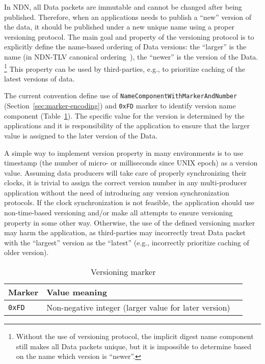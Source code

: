 In NDN, all Data packets are immutable and cannot be changed after being published.
Therefore, when an applications needs to publish a ``new'' version of the data, it should be published under a new unique name using a proper versioning protocol.
The main goal and property of the versioning protocol is to explicitly define the name-based ordering of Data versions: the ``larger'' is the name (in NDN-TLV canonical ordering~\cite{ndn-tlv}), the ``newer'' is the version of the Data.%
\footnote{Without the use of versioning protocol, the implicit digest name component still makes all Data packets unique, but it is impossible to determine based on the name which version is ``newer''.}
This property can be used by third-parties, e.g., to prioritize caching of the latest versions of data.

The current convention define use of \texttt{NameComponentWithMarkerAndNumber} (Section~\ref{sec:marker-encoding}) and \verb|0xFD| marker to identify version name component (Table~\ref{tab:versioning}).
The specific value for the version is determined by the applications and it is responsibility of the application to ensure that the larger value is assigned to the later version of the Data.

A simple way to implement version property in many environments is to use timestamp (the number of micro- or milliseconds since UNIX epoch) as a version value.
Assuming data producers will take care of properly synchronizing their clocks, it is trivial to assign the correct version number in any multi-producer application without the need of introducing any version synchronization protocols.
If the clock synchronization is not feasible, the application should use non-time-based versioning and/or make all attempts to ensure versioning property in some other way.
Otherwise, the use of the defined versioning marker may harm the application, as third-parties may incorrectly treat Data packet with the ``largest'' version as the ``latest'' (e.g., incorrectly prioritize caching of older version).


\begin{table}[h!]
  \centering
  \caption{Versioning marker}
  \label{tab:versioning}
  \begin{tabular}{|l|l|l|}
    \hline
    Marker & Value meaning \\
    \hline \hline
    \verb|0xFD| & Non-negative integer (larger value for later version) \\
    \hline
  \end{tabular}
\end{table}



